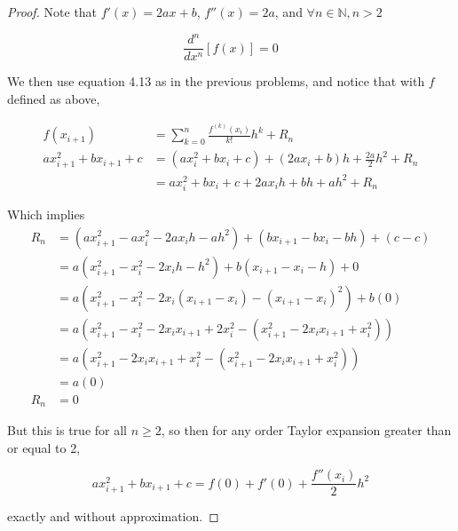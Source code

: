 \documentclass{article}
\begin{document}
\begin{proof}
Note that $f'(x) = 2ax+b$, $f''(x) = 2a$, and $\forall n\in\mathbb{N}, n>2$

\[ \frac{d^{n}}{dx^{n}}\left[ f(x) \right] = 0 \]

We then use equation 4.13 as in the previous problems, and notice that with $f$ defined as above, 

\begin{align*}
f(x_{i+1}) &= \sum_{k=0}^{n} \frac{f^{(k)}(x_{i})}{k!} h^{k} + R_{n}\\
ax_{i+1}^{2} + bx_{i+1} + c &= (ax_{i}^{2} + bx_{i} + c) + (2ax_{i} + b)h + \frac{2a}{2}h^{2} + R_{n}\\
							&= ax_{i}^{2} + bx_{i} + c + 2ax_{i}h + bh + ah^{2} + R_{n}
\end{align*}

Which implies
\begin{align*}
R_{n} 	&= (ax_{i+1}^{2} - ax_{i}^{2} - 2ax_{i}h - ah^{2}) + (bx_{i+1} - bx_{i} - bh) + (c - c)\\
		&= a(x_{i+1}^{2} - x_{i}^{2} - 2x_{i}h - h^{2}) + b(x_{i+1} - x_{i} - h) + 0\\
		&= a(x_{i+1}^{2} - x_{i}^{2} - 2x_{i}(x_{i+1} - x_{i}) - (x_{i+1} - x_{i})^{2}) + b(0)\\
		&= a(x_{i+1}^{2} - x_{i}^{2} - 2x_{i}x_{i+1} + 2x_{i}^{2} - (x_{i+1}^{2} - 2x_{i}x_{i+1} + x_{i}^{2}))\\
		&= a(x_{i+1}^{2} - 2x_{i}x_{i+1} + x_{i}^{2} - (x_{i+1}^{2} - 2x_{i}x_{i+1} + x_{i}^{2}))\\
		&= a(0)\\
R_{n}	&= 0
\end{align*}

But this is true for all $n\geq 2$, so then for any order Taylor expansion greater than or equal to 2,

\[ ax_{i+1}^{2} + bx_{i+1} + c = f(0) + f'(0) + \frac{f''(x_{i})}{2}h^{2} \]

exactly and without approximation.

\end{proof}
\end{document}
